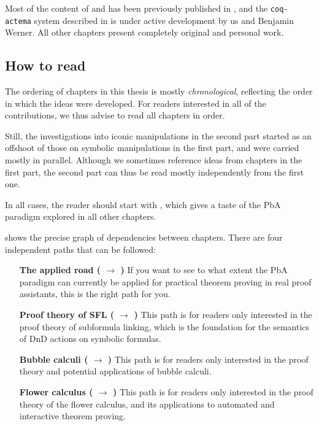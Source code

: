 \begin{kaobox}[frametitle=Note]
Most of the content of  and  has been previously published
in \cite{10.1145/3497775.3503692}, and the \texttt{coq-actema} system described
in  is under active development by us and Benjamin Werner. All
other chapters present completely original and personal work.
\end{kaobox}

\subsection{How to read}

The ordering of chapters in this thesis is mostly \emph{chronological},
reflecting the order in which the ideas were developed. For readers interested
in all of the contributions, we thus advise to read all chapters in order.

Still, the investigations into iconic manipulations in the second part started
as an offshoot of those on symbolic manipulations in the first part, and were
carried mostly in parallel. Although we sometimes reference ideas from chapters
in the first part, the second part can thus be read mostly independently from
the first one.

\begin{emphpar}
  In all cases, the reader should start with , which gives a taste of
  the PbA paradigm explored in all other chapters.
\end{emphpar}

 shows the precise graph of dependencies between chapters.
There are four independent paths that can be followed:
\begin{itemize}
  \item[\textbf{The applied road (\ding{175} $\to$ \ding{177})}] If
  you want to see to what extent the PbA paradigm can currently be applied for
  practical theorem proving in real proof assistants, this is the right path for
  you.

  \item[\textbf{Proof theory of SFL (\ding{174} $\to$ \ding{176})}]
  This path is for readers only interested in the proof theory of subformula
  linking, which is the foundation for the semantics of DnD actions on symbolic
  formulas.

  \item[\textbf{Bubble calculi (\ding{178} $\to$ \ding{179})}]
  This path is for readers only interested in the proof theory and potential
  applications of bubble calculi.
  
  \item[\textbf{Flower calculus (\ding{180} $\to$ \ding{181})}] This path is for
  readers only interested in the proof theory of the flower calculus, and its
  applications to automated and interactive theorem proving.
\end{itemize}

